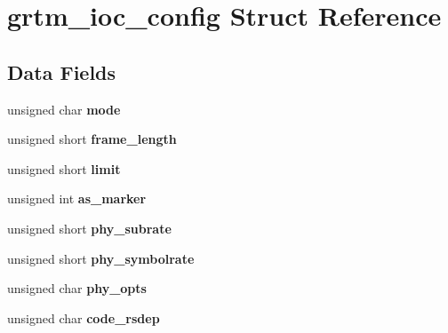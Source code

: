 \hypertarget{structgrtm__ioc__config}{}\section{grtm\+\_\+ioc\+\_\+config Struct Reference}
\label{structgrtm__ioc__config}
\subsection*{Data Fields}
\begin{DoxyCompactItemize}
\item 
\mbox{\label{structgrtm__ioc__config_a74f0a4d982e7ab5ca88ebd0340909304}} 
unsigned char {\bfseries mode}
\item 
\mbox{\label{structgrtm__ioc__config_a74efba746ced1f3bcd258cfc5596b935}} 
unsigned short {\bfseries frame\+\_\+length}
\item 
\mbox{\label{structgrtm__ioc__config_af96c9c6d8bc9f17234ef71b1258dfa79}} 
unsigned short {\bfseries limit}
\item 
\mbox{\label{structgrtm__ioc__config_aa51b5599468e39aaa373a124fc4d3405}} 
unsigned int {\bfseries as\+\_\+marker}
\item 
\mbox{\label{structgrtm__ioc__config_ae3b3c08da79168272d89de4c40b73159}} 
unsigned short {\bfseries phy\+\_\+subrate}
\item 
\mbox{\label{structgrtm__ioc__config_a094c0bd0d76396a1f0c3f461e1674184}} 
unsigned short {\bfseries phy\+\_\+symbolrate}
\item 
\mbox{\label{structgrtm__ioc__config_a30a4360082b4941e8b3e2d7bddcbdf98}} 
unsigned char {\bfseries phy\+\_\+opts}
\item 
\mbox{\label{structgrtm__ioc__config_a8b2ef386b30cd1c51b2e875f01027120}} 
unsigned char {\bfseries code\+\_\+rsdep}
\item 
\mbox{\label{structgrtm__ioc__config_a93186927bcbb349d4c06481f1b347480}} 

\end{DoxyCompactItemize}
